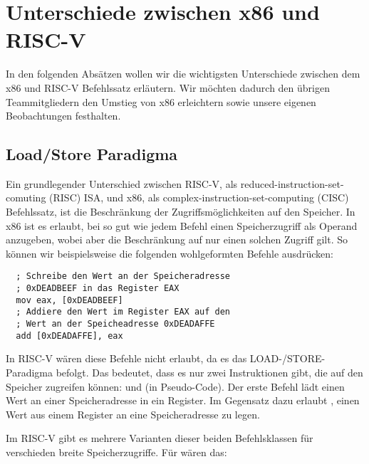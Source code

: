 \section{Unterschiede zwischen x86 und RISC-V}

In den folgenden Absätzen wollen wir die wichtigsten Unterschiede zwischen dem
x86 und RISC-V Befehlssatz erläutern. Wir möchten dadurch den übrigen
Teammitgliedern den Umstieg von x86 erleichtern sowie unsere eigenen
Beobachtungen festhalten.

\subsection{Load/Store Paradigma}

Ein grundlegender Unterschied zwischen RISC-V, als
reduced-instruction-set-comuting (RISC) ISA, und x86, als
complex-instruction-set-computing (CISC) Befehlssatz, ist die Beschränkung der
Zugriffsmöglichkeiten auf den Speicher. In x86 ist es erlaubt, bei so gut wie
jedem Befehl einen Speicherzugriff als Operand anzugeben, wobei aber die
Beschränkung auf nur einen solchen Zugriff gilt. So können wir beispielsweise
die folgenden wohlgeformten Befehle ausdrücken:

\begin{lstlisting}
  ; Schreibe den Wert an der Speicheradresse
  ; 0xDEADBEEF in das Register EAX
  mov eax, [0xDEADBEEF]
  ; Addiere den Wert im Register EAX auf den
  ; Wert an der Speicheadresse 0xDEADAFFE
  add [0xDEADAFFE], eax
\end{lstlisting}

In RISC-V wären diese Befehle nicht erlaubt, da es das LOAD-/STORE-Paradigma
befolgt. Das bedeutet, dass es nur zwei Instruktionen gibt, die auf den Speicher
zugreifen können:  und  (in Pseudo-Code). Der erste
Befehl lädt einen Wert an einer Speicheradresse in ein Register. Im
Gegensatz dazu erlaubt , einen Wert aus einem Register an eine
Speicheradresse zu legen.

Im RISC-V gibt es mehrere Varianten dieser beiden Befehlsklassen für
verschieden breite Speicherzugriffe. Für  wären das:

